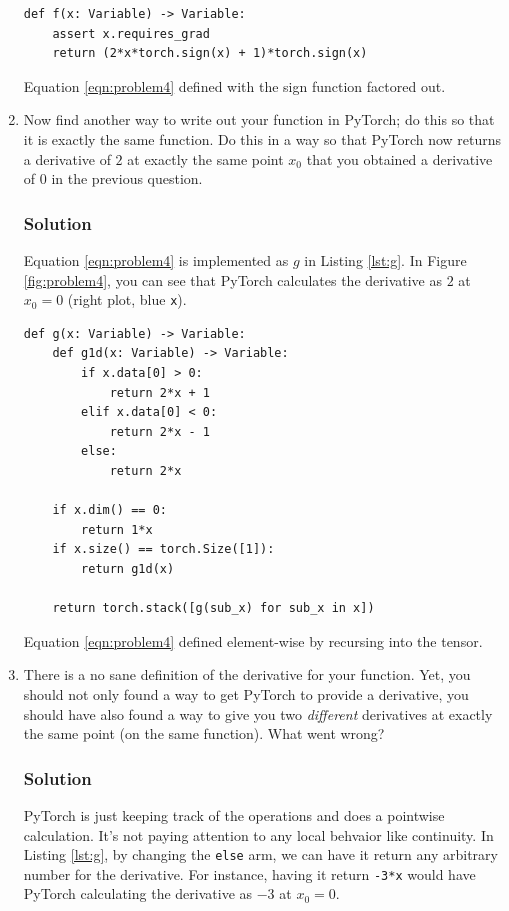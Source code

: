 \documentclass[letterpaper,11pt]{article}
\begin{document}
\begin{enumerate}
  \begin{listing}
\begin{verbatim}
def f(x: Variable) -> Variable:
    assert x.requires_grad
    return (2*x*torch.sign(x) + 1)*torch.sign(x)
\end{verbatim}
  \caption{Equation \ref{eqn:problem4} defined with the sign function factored out.}
\label{lst:f}
\end{listing}

\item Now find another way to write out your function in PyTorch; do
  this so that it is exactly the same function. Do this in a way so
  that PyTorch now returns a derivative of $2$ at exactly the same
  point $x_0$ that you obtained a derivative of $0$ in the previous
  question.
  \subsubsection*{Solution}
  Equation \ref{eqn:problem4} is implemented as $g$ in Listing
  \ref{lst:g}. In Figure \ref{fig:problem4}, you can see that PyTorch
  calculates the derivative as $2$ at $x_0 = 0$ (right plot, blue
  \texttt{x}).
  
\begin{listing}
\begin{verbatim}
def g(x: Variable) -> Variable:
    def g1d(x: Variable) -> Variable:
        if x.data[0] > 0:
            return 2*x + 1
        elif x.data[0] < 0:
            return 2*x - 1
        else:
            return 2*x

    if x.dim() == 0:
        return 1*x    
    if x.size() == torch.Size([1]):
        return g1d(x)

    return torch.stack([g(sub_x) for sub_x in x])
\end{verbatim}
  \caption{Equation \ref{eqn:problem4} defined element-wise by recursing into the tensor.}
\label{lst:g}
\end{listing}
\item There is a no sane definition of the derivative for your
  function. Yet, you should not only found a way to get PyTorch to
  provide a derivative, you should have also found a way to give you
  two \emph{different} derivatives at exactly the same point (on the same
  function). What went wrong?

  \subsubsection*{Solution}

  PyTorch is just keeping track of the operations and does a pointwise
  calculation. It's not paying attention to any local behvaior like
  continuity. In Listing \ref{lst:g}, by changing the \texttt{else}
  arm, we can have it return any arbitrary number for the
  derivative. For instance, having it return \texttt{-3*x} would have
  PyTorch calculating the derivative as $-3$ at $x_0 = 0$.
\end{enumerate}
\end{document}
